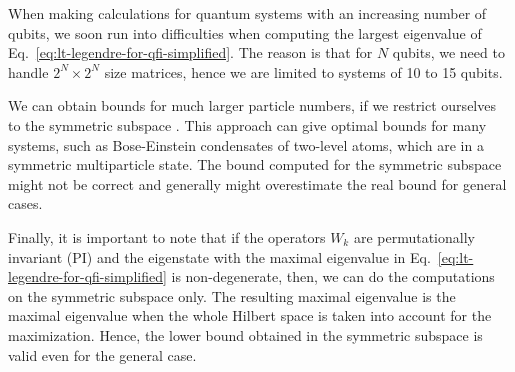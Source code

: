 When making calculations for quantum systems with an increasing number of qubits, we soon run into difficulties when computing the largest eigenvalue of Eq.~\eqref{eq:lt-legendre-for-qfi-simplified}.
The reason is that for $N$ qubits, we need to handle $2^N \times 2^N$ size matrices, hence we are limited to systems of 10 to 15 qubits.

We can obtain bounds for much larger particle numbers, if we restrict ourselves to the symmetric subspace \cite{}.
This approach can give optimal bounds for many systems, such as Bose-Einstein condensates of two-level atoms, which are in a symmetric multiparticle state.
The bound computed for the symmetric subspace might not be correct and generally might overestimate the real bound for general cases.

Finally, it is important to note that if the operators $W_k$ are permutationally invariant (PI) and the eigenstate with the maximal eigenvalue in Eq.~\eqref{eq:lt-legendre-for-qfi-simplified} is non-degenerate, then, we can do the computations on the symmetric subspace only.
The resulting maximal eigenvalue is the maximal eigenvalue when the whole Hilbert space is taken into account for the maximization.
Hence, the lower bound obtained in the symmetric subspace is valid even for the general case.

